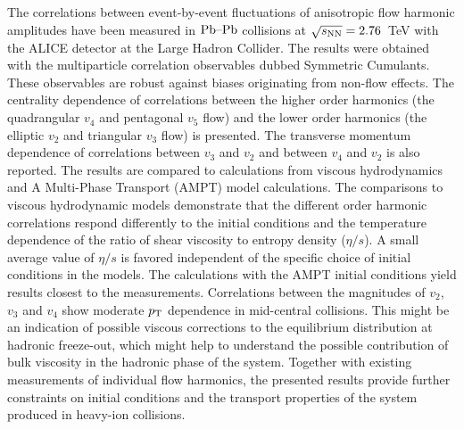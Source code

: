 The correlations between event-by-event fluctuations of anisotropic flow harmonic amplitudes
have been measured in $\textnormal{Pb--Pb}$ collisions at $\sqrt{s_{\textnormal{NN}}}=2.76$~TeV with the ALICE detector at the Large Hadron Collider. 
The results were obtained with the multiparticle correlation observables dubbed Symmetric Cumulants.
These observables are robust against biases originating from non-flow effects. 
The centrality dependence of correlations between the higher order harmonics (the quadrangular $v_4$ and pentagonal $v_5$ flow) and the lower order harmonics (the elliptic $v_2$ and triangular $v_3$ flow)
is presented. The transverse momentum dependence of correlations between $v_3$ and $v_2$ and between $v_4$ and $v_2$ is also reported. 
The results are compared to calculations from viscous hydrodynamics and  A Multi-Phase Transport ({AMPT}) model calculations.
The comparisons to viscous hydrodynamic models demonstrate that
the different order harmonic correlations respond differently to the initial conditions and the temperature dependence of the ratio of shear viscosity to entropy density ($\eta/s$). 
A small average value of $\eta/s$ is favored independent of the specific choice of initial conditions in the models. The calculations with the AMPT initial conditions yield results closest to the measurements. 
Correlations between the magnitudes of $v_2$, $v_3$ and $v_4$ show moderate $p_{\rm T}$ dependence in mid-central collisions. This might be an indication of possible viscous corrections to the equilibrium distribution at hadronic freeze-out, which might help to understand the possible contribution of bulk viscosity in the hadronic phase of the system.
Together with existing measurements of individual flow harmonics, the presented results provide further constraints 
on initial conditions and the transport properties of the system produced in heavy-ion collisions.
